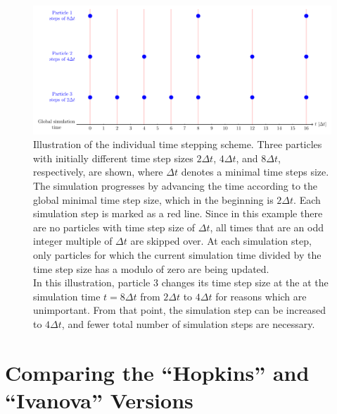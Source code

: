 \begin{figure}
 \centering
 \includegraphics[width=\textwidth]{figures/Meshless/individual_timestepping.pdf}
 \caption{
Illustration of the individual time stepping scheme. Three particles with initially different time
step sizes $2 \Delta t$, $4 \Delta t$, and $8 \Delta t$, respectively, are shown, where $\Delta t$
denotes a minimal time steps size. The simulation progresses by advancing the time according to the
global minimal time step size, which in the beginning is $2 \Delta t$. Each simulation step is
marked as a red line. Since in this example there are no particles with time step size of $\Delta
t$, all times that are an odd integer multiple of $\Delta t$ are skipped over.
At each simulation step, only particles for which the current simulation time divided by the time
step size has a modulo of zero are being updated.\\
%
In this illustration, particle 3 changes its time step size at the at the simulation time $t = 8
\Delta t$ from $2 \Delta t$ to $4 \Delta t$ for reasons which are unimportant. From that point, the
simulation step can be increased to $4 \Delta t$, and fewer total number of simulation steps are
necessary.
}
 \label{fig:individual-timesteps}
\end{figure}


























\section{Comparing the ``Hopkins'' and ``Ivanova'' Versions}\label{chap:meshless-comparison}

